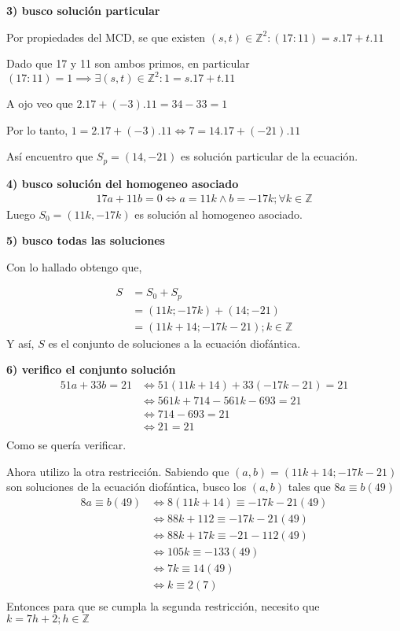 \textbf{3) busco solución particular}

Por propiedades del MCD, se que existen $ (s,t) \in \mathbb{Z}^2: (17:11) = s.17 + t.11 $

Dado que 17 y 11 son ambos primos, en particular $ (17:11) = 1 \implies \exists (s,t) \in \mathbb{Z}^2: 1 = s.17 + t.11 $

A ojo veo que $ 2.17 + (-3).11 = 34 - 33 = 1 $

Por lo tanto, $ 1 = 2.17 + (-3).11 \iff 7 = 14.17 + (-21).11 $

Así encuentro que $ S_p = (14,-21) $ es solución particular de la ecuación.

\textbf{4) busco solución del homogeneo asociado}
\begin{align*}
    17a + 11b = 0 \iff a = 11k \wedge b = -17k; \forall k \in \mathbb{Z}
\end{align*}
Luego $ S_0 = (11k, -17k) $ es solución al homogeneo asociado.

\textbf{5) busco todas las soluciones}

Con lo hallado obtengo que,

\begin{align*}
    S &= S_0 + S_p \\ 
    &= (11k; -17k) + (14; -21) \\ 
    &= (11k+14; -17k-21); k \in \mathbb{Z}
\end{align*}
Y así, $S$ es el conjunto de soluciones a la ecuación diofántica.

\textbf{6) verifico el conjunto solución}
\begin{align*}
    51a+33b = 21 &\iff 51(11k+14) + 33(-17k-21) = 21 \\ 
    &\iff 561k + 714 - 561k - 693 = 21 \\
    &\iff 714 - 693 = 21 \\
    &\iff 21 = 21 \\
\end{align*}
Como se quería verificar.

Ahora utilizo la otra restricción. Sabiendo que $ (a,b) = (11k+14; -17k-21) $ son soluciones de la ecuación diofántica, busco los $(a,b) $ tales que $ 8a \equiv b(49) $
\begin{align*}
    8a \equiv b(49) &\iff 8(11k+14) \equiv -17k-21(49) \\
    &\iff 88k + 112 \equiv -17k-21(49) \\
    &\iff 88k + 17k \equiv -21-112(49) \\
    &\iff 105k \equiv -133(49) \\
    &\iff 7k \equiv 14(49) \\
    &\iff k \equiv 2(7) \\
\end{align*}
Entonces para que se cumpla la segunda restricción, necesito que $ k = 7h + 2; h \in \mathbb{Z} $ 


